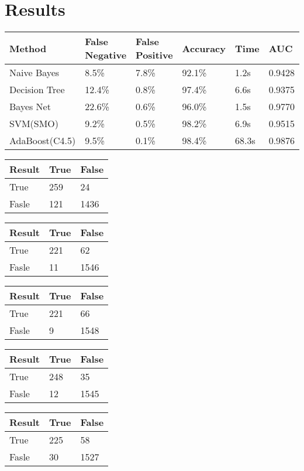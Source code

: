 \section{Results}
\begin{tabular}{|l|l l l l l|}
\hline
Method & False Negative & False Positive & Accuracy & Time & AUC \\
\hline
Naive Bayes & 8.5\% & 7.8\% & 92.1\% & 1.2s & 0.9428 \\
Decision Tree & 12.4\% & 0.8\% & 97.4\% & 6.6s & 0.9375 \\
Bayes Net & 22.6\% & 0.6\% & 96.0\% & 1.5s & 0.9770 \\
SVM(SMO) & 9.2\% & 0.5\% & 98.2\% & 6.9s & 0.9515 \\
AdaBoost(C4.5) & 9.5\% & 0.1\% & 98.4\% & 68.3s & 0.9876 \\
\hline
\end{tabular}
\begin{tabular}{|l|l l|}
\hline
Result & True & False \\
\hline
True & 259 & 24 \\
Fasle & 121 & 1436 \\
\hline
\end{tabular}
\begin{tabular}{|l|l l|}
\hline
Result & True & False \\
\hline
True & 221 & 62 \\
Fasle & 11 & 1546 \\
\hline
\end{tabular}
\begin{tabular}{|l|l l|}
\hline
Result & True & False \\
\hline
True & 221 & 66 \\
Fasle & 9 & 1548 \\
\hline
\end{tabular}
\begin{tabular}{|l|l l|}
\hline
Result & True & False \\
\hline
True & 248 & 35 \\
Fasle & 12 & 1545 \\
\hline
\end{tabular}
\begin{tabular}{|l|l l|}
\hline
Result & True & False \\
\hline
True & 225 & 58 \\
Fasle & 30 & 1527 \\
\hline
\end{tabular}

